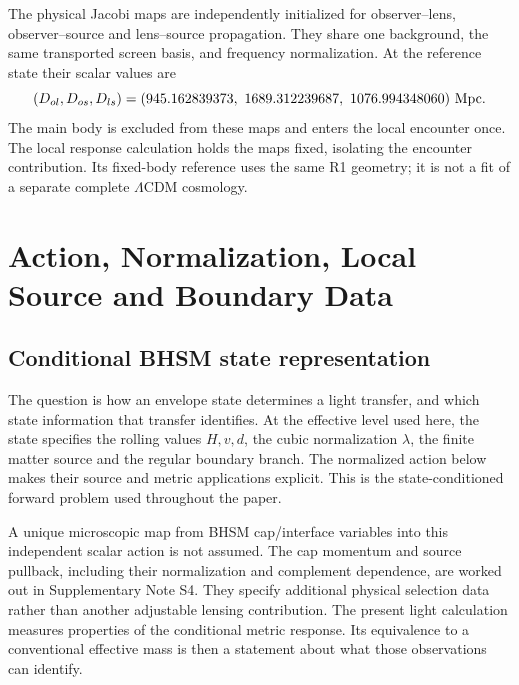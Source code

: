 The physical Jacobi maps are independently initialized for
observer--lens, observer--source and lens--source propagation. They share
one background, the same transported screen basis, and frequency
normalization. At the reference state their scalar values are
\begin{equation}
 (D_{ol},D_{os},D_{ls})
 =(945.162839373,\ 1689.312239687,\ 1076.994348060)\ {\rm Mpc}.
 \label{eq:maps}
\end{equation}
The main body is excluded from these maps and enters the local encounter
once. The local response calculation holds the maps fixed, isolating the
encounter contribution. Its fixed-body reference uses the same R1
geometry; it is not a fit of a separate complete
$\Lambda$CDM cosmology.

\section{Action, Normalization, Local Source and Boundary Data}
\label{sec:scalar}
\subsection{Conditional BHSM state representation}
The question is how an envelope state determines a light transfer, and
which state information that transfer identifies. At the effective level
used here, the state specifies the rolling values $H,v,d$, the cubic
normalization $\lambda$, the finite matter source and the regular
boundary branch. The normalized action below makes their source and
metric applications explicit. This is the state-conditioned forward
problem used throughout the paper.

A unique microscopic map from BHSM cap/interface variables into this
independent scalar action is not assumed. The cap momentum and source
pullback, including their normalization and complement dependence, are
worked out in Supplementary Note S4. They specify additional physical
selection data rather than another adjustable lensing contribution.
The present light calculation measures properties of the conditional
metric response. Its equivalence to a conventional effective mass is
then a statement about what those observations can identify.

